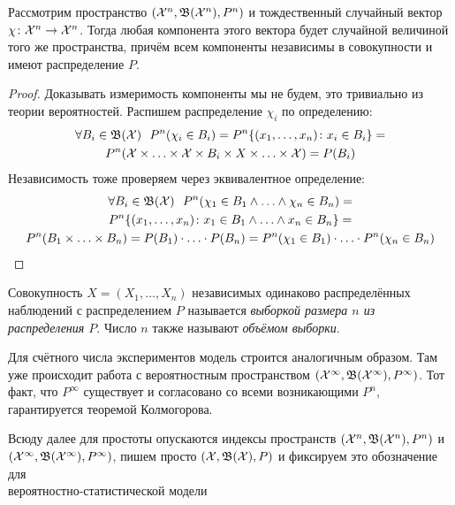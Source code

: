 \begin{proposition}
	Рассмотрим пространство $(\mathcal{X}^n, \mathfrak{B}(\mathcal{X}^n), P^n)$ и тождественный случайный вектор $\chi \colon \mathcal{X}^n \to \mathcal{X}^n$. Тогда любая компонента этого вектора будет случайной величиной того же пространства, причём всем компоненты независимы в совокупности и имеют распределение $P$.
\end{proposition}

\begin{proof}
	Доказывать измеримость компоненты мы не будем, это тривиально из теории вероятностей. Распишем распределение $\chi_i$ по определению:
	\begin{multline*}
		\forall B_i \in \mathfrak{B}(\mathcal{X})\ \ P^n(\chi_i \in B_i) = P^n\{(x_1, \ldots, x_n) \colon x_i \in B_i\} =
		\\
		P^n(\mathcal{X} \times \ldots \times \mathcal{X} \times B_i \times X \times \ldots \times \mathcal{X}) = P(B_i)
	\end{multline*}
	Независимость тоже проверяем через эквивалентное определение:
	\begin{multline*}
		\forall B_i \in \mathfrak{B}(\mathcal{X})\ \ P^n(\chi_1 \in B_1 \wedge \ldots \wedge \chi_n \in B_n) =
		\\
		P^n\{(x_1, \ldots, x_n) \colon x_1 \in B_1 \wedge \ldots \wedge x_n \in B_n\} =
		\\
		P^n(B_1 \times \ldots \times B_n) = P(B_1) \cdot \ldots \cdot P(B_n) = P^n(\chi_1 \in B_1) \cdot \ldots \cdot P^n(\chi_n \in B_n)
	\end{multline*}
\end{proof}

\begin{definition}
	Совокупность $X = (X_1, \ldots, X_n)$ независимых одинаково распределённых наблюдений с распределением $P$ называется \textit{выборкой размера $n$ из распределения $P$}. Число $n$ также называют \textit{объёмом выборки}.
\end{definition}

\begin{note}
	Для счётного числа экспериментов модель строится аналогичным образом. Там уже происходит работа с вероятностным пространством $(\mathcal{X}^\infty, \mathfrak{B}(\mathcal{X}^\infty), P^\infty)$. Тот факт, что $P^\infty$ существует и согласовано со всеми возникающими $P^n$, гарантируется теоремой Колмогорова.
\end{note}

\begin{note}
	Всюду далее для простоты опускаются индексы пространств $(\mathcal{X}^n, \mathfrak{B}(\mathcal{X}^n), P^n)$ и $(\mathcal{X}^\infty, \mathfrak{B}(\mathcal{X}^\infty), P^\infty)$, пишем просто $(\mathcal{X}, \mathfrak{B}(\mathcal{X}), P)$ и фиксируем это обозначение для \\ вероятностно-статистической модели
\end{note}

